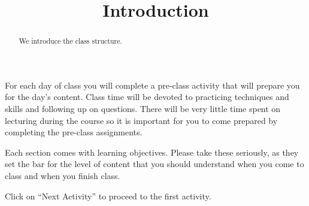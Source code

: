 \documentclass{ximera}
\title{Introduction}
\begin{document}
\begin{abstract}
We introduce the class structure.
\end{abstract}
\maketitle

For each day of class you will complete a pre-class activity that will prepare you for the day's content. Class time will be devoted to practicing techniques and skills and following up on questions. There will be very little time spent on lecturing during the course so it is important for you to come prepared by completing the pre-class assignments.

Each section comes with learning objectives. Please take these seriously, as they set the bar for the level of content that you should understand when you come to class and when you finish class. 

Click on ``Next Activity'' to proceed to the first activity.
\end{document}
